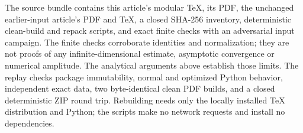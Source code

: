 The source bundle contains this article's modular TeX, its PDF,
the unchanged earlier-input article's PDF and TeX, a closed SHA-256
inventory, deterministic clean-build and repack scripts, and exact
finite checks with an adversarial input campaign. The finite checks
corroborate identities and normalization; they are not proofs of any
infinite-dimensional estimate, asymptotic convergence or numerical
amplitude. The analytical arguments above establish those limits.
The replay checks package immutability, normal and optimized Python
behavior, independent exact data, two byte-identical clean PDF builds,
and a closed deterministic ZIP round trip. Rebuilding needs only the
locally installed TeX distribution and Python; the scripts make no
network requests and install no dependencies.
